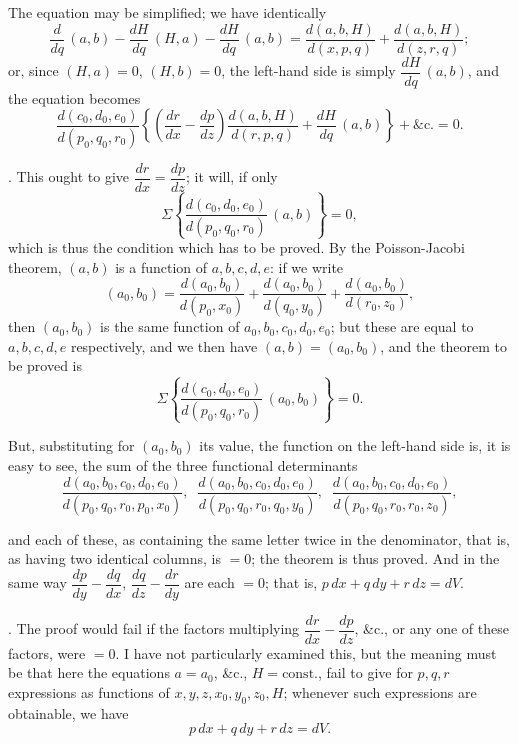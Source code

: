 \documentclass[11pt,a4paper]{article}
\begin{document}
The equation may be simplified; we have identically
\[
\frac{d}{dq}\,(a, b) - \frac{dH}{dq}\,(H, a) - \frac{dH}{dq}\,(a, b) = \frac{d(a, b, H)}{d(x, p, q)} + \frac{d(a, b, H)}{d(z, r, q)};
\]
or, since $(H, a) = 0$, $(H, b) = 0$, the left-hand side is simply $\dfrac{dH}{dq}\,(a, b)$, and the equation becomes
\[
\frac{d(c_{0}, d_{0}, e_{0})}{d(p_{0}, q_{0}, r_{0})}\!\left\{\!\left( \frac{dr}{dx} - \frac{dp}{dz} \right)\!\frac{d(a, b, H)}{d(r, p, q)} + \frac{dH}{dq}\,(a, b) \right\} + \&\text{c.} = 0.
\]

\medskip

. This ought to give $\dfrac{dr}{dx} = \dfrac{dp}{dz}$; it will, if only
\[
\Sigma\!\left\{ \frac{d(c_{0}, d_{0}, e_{0})}{d(p_{0}, q_{0}, r_{0})}\,(a, b) \right\} = 0,
\]
which is thus the condition which has to be proved. By the Poisson-Jacobi theorem, $(a, b)$ is a function of $a, b, c, d, e$: if we write
\[
(a_{0}, b_{0}) = \frac{d(a_{0}, b_{0})}{d(p_{0}, x_{0})} + \frac{d(a_{0}, b_{0})}{d(q_{0}, y_{0})} + \frac{d(a_{0}, b_{0})}{d(r_{0}, z_{0})},
\]
then $(a_{0}, b_{0})$ is the same function of $a_{0}, b_{0}, c_{0}, d_{0}, e_{0}$; but these are equal to $a, b, c, d, e$ respectively, and we then have $(a, b) = (a_{0}, b_{0})$, and the theorem to be proved is
\[
\Sigma\!\left\{ \frac{d(c_{0}, d_{0}, e_{0})}{d(p_{0}, q_{0}, r_{0})}\,(a_{0}, b_{0}) \right\} = 0.
\]

But, substituting for $(a_{0}, b_{0})$ its value, the function on the left-hand side is, it is easy to see, the sum of the three functional determinants
\[
\frac{d(a_{0}, b_{0}, c_{0}, d_{0}, e_{0})}{d(p_{0}, q_{0}, r_{0}, p_{0}, x_{0})}, \;\; \frac{d(a_{0}, b_{0}, c_{0}, d_{0}, e_{0})}{d(p_{0}, q_{0}, r_{0}, q_{0}, y_{0})}, \;\; \frac{d(a_{0}, b_{0}, c_{0}, d_{0}, e_{0})}{d(p_{0}, q_{0}, r_{0}, r_{0}, z_{0})},
\]

\newpage


and each of these, as containing the same letter twice in the denominator, that is, as having two identical columns, is $= 0$; the theorem is thus proved. And in the same way $\dfrac{dp}{dy} - \dfrac{dq}{dx}$, $\dfrac{dq}{dz} - \dfrac{dr}{dy}$ are each $= 0$; that is, $p\,dx + q\,dy + r\,dz = dV$.

\medskip

. The proof would fail if the factors multiplying $\dfrac{dr}{dx} - \dfrac{dp}{dz}$, \&c., or any one of these factors, were $= 0$. I have not particularly examined this, but the meaning must be that here the equations $a = a_{0}$, \&c., $H = \text{const.}$, fail to give for $p, q, r$ expressions as functions of $x, y, z, x_{0}, y_{0}, z_{0}, H$; whenever such expressions are obtainable, we have
\[
p\,dx + q\,dy + r\,dz = dV.
\]
\end{document}

